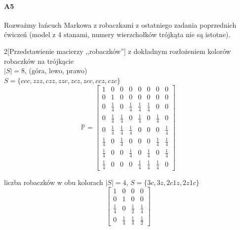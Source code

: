 \documentclass[a4paper,12pt]{article}
\theoremstyle{definition}%
\theoremstyle{definition}
\theoremstyle{problem}
\begin{document}
\paragraph{A5} Rozważmy łańcuch Markowa z robaczkami z ostatniego zadania poprzednich ćwiczeń (model z 4 stanami, numery wierzchołków trójkąta nie są istotne).
\begin{multicols}{2}[Przedstawienie macierzy ,,robaczków'']
z  dokładnym rozłożeniem kolorów robaczków na trójkącie\\
$|S|=8$, (góra, lewo, prawo)\\ $S=\{ccc,zzz,czz,zzc,zcz,zcc,ccz,czc\}$
$$\mathbb{P}=\begin{bmatrix}
1&0&0&0&0&0&0&0\\
0&1&0&0&0&0&0&0\\
0&\frac{1}{4}&0&\frac{1}{4}&\frac{1}{4}&\frac{1}{4}&0&0\\
0&\frac{1}{4}&\frac{1}{4}&0&\frac{1}{4}&0&\frac{1}{4}&0\\
0&\frac{1}{4}&\frac{1}{4}&\frac{1}{4}&0&0&0&\frac{1}{4}\\
\frac{1}{4}&0&\frac{1}{4}&0&0&0&\frac{1}{4}&\frac{1}{4}\\
\frac{1}{4}&0&0&\frac{1}{4}&0&\frac{1}{4}&0&\frac{1}{4}\\
\frac{1}{4}&0&0&0&\frac{1}{4}&\frac{1}{4}&\frac{1}{4}&0
\end{bmatrix}$$

liczba robaczków w obu kolorach
$|S|=4$, $S=\{3c,3z,2c1z,2z1c\}$
$$\begin{bmatrix}
1&0&0&0\\
0&1&0&0\\
\frac{1}{4}&0&\frac{1}{2}&\frac{1}{4}\\
0&\frac{1}{4}&\frac{1}{4}&\frac{1}{2}
\end{bmatrix}$$
\end{multicols}
\end{document}
